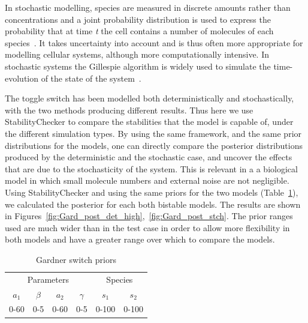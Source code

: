 In stochastic modelling, species are measured in discrete amounts rather than concentrations and a joint probability distribution is used to express the probability that at time \textit{t} the cell contains a number of molecules of each species~\autocite{deJong:2002ft}. It takes uncertainty into account and is thus often more appropriate for modelling cellular systems, although more computationally intensive. In stochastic systems the Gillespie algorithm is widely used to simulate the time-evolution of the state of the system~\autocite{Warren:2005kea}.

The toggle switch has been modelled both deterministically and stochastically, with the two methods producing different results. Thus here we use StabilityChecker to compare the stabilities that the model is capable of, under the different simulation types. By using the same framework, and the same prior distributions for the models, one can directly compare the posterior distributions produced by the deterministic and the stochastic case, and uncover the effects that are due to the stochasticity of the system. This is relevant in a a biological model in which small molecule numbers and external noise are not negligible. Using StabilityChecker and using the same priors for the two models (Table~\ref{tab:gard_det_stoch}), we calculated the posterior for each both bistable models. The results are shown in Figures~\ref{fig:Gard_post_det_high},~\ref{fig:Gard_post_stch}. The prior ranges used are much wider than in the test case in order to allow more flexibility in both models and have a greater range over which to compare the models. 

\clearpage
\begin{table}[p]
\centering
\caption{Gardner switch priors}
\label{tab:gard_det_stoch}
\begin{tabular}{cccc|cc}
\multicolumn{4}{c|}{Parameters} & \multicolumn{2}{c}{Species} \\ %
$a_1$   & $\beta$   & $a_2$   & $\gamma$  &   $s_1$      &       $s_2$   \\
0-60    & 0-5       & 0-60    &  0-5      &      0-100   &          0-100   
\end{tabular}
\end{table}


